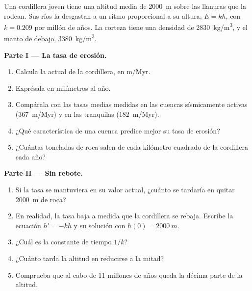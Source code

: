 \begin{problem}
\label{pb:g12:destruction-of-mountains:1}
Una cordillera joven tiene una altitud media de \qty{2000}{m} sobre las
llanuras que la rodean. Sus ríos la desgastan a un ritmo proporcional a su
altura, $E = kh$, con $k = 0.209$ por millón de años. La corteza tiene una
densidad de \qty{2830}{kg/m^3}, y el manto de debajo, \qty{3380}{kg/m^3}.

\medskip
\noindent\textbf{Parte I --- La tasa de erosión.}
\begin{enumerate}
  \item Calcula la  actual de la cordillera, en \unit{m/Myr}.
  \item Exprésala en milímetros al año.
  \item Compárala con las tasas medias medidas en las cuencas sísmicamente
        activas (\qty{367}{m/Myr}) y en las tranquilas (\qty{182}{m/Myr}).
  \item ¿Qué característica de una cuenca predice mejor su tasa de erosión?
  \item ¿Cuántas toneladas de roca salen de cada kilómetro cuadrado de la
        cordillera cada año?
\end{enumerate}

\medskip
\noindent\textbf{Parte II --- Sin rebote.}
\begin{enumerate}[resume]
  \item Si la tasa se mantuviera en su valor actual, ¿cuánto se tardaría en
        quitar \qty{2000}{m} de roca?
  \item En realidad, la tasa baja a medida que la cordillera se rebaja.
        Escribe la ecuación $h' = -kh$ y su solución con $h(0) = \qty{2000}{m}$.
  \item ¿Cuál es la constante de tiempo $1/k$?
  \item ¿Cuánto tarda la altitud en reducirse a la mitad?
  \item Comprueba que al cabo de 11 millones de años queda la décima parte
        de la altitud.
\end{enumerate}


\end{problem}

